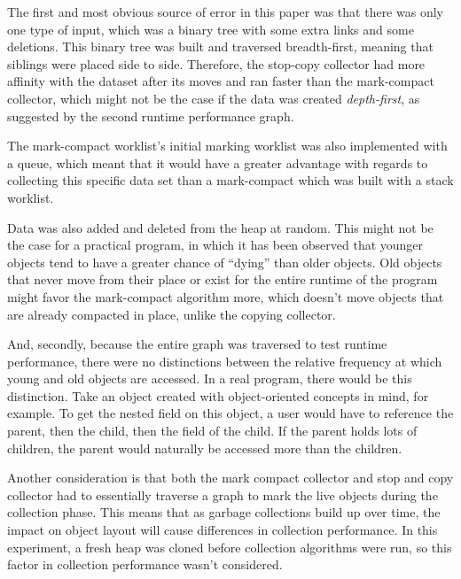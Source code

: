 \documentclass[index]{subfiles}
\begin{document}
The first and most obvious source of error in this paper was that there was only one type of input, which was a binary tree with some extra links and some deletions. This binary tree was built and traversed breadth-first, meaning that siblings were placed side to side. Therefore, the stop-copy collector had more affinity with the dataset after its moves and ran faster than the mark-compact collector, which might not be the case if the data was created \textit{depth-first}, as suggested by the second runtime performance graph.

The mark-compact worklist's initial marking worklist was also implemented with a queue, which meant that it would have a greater advantage with regards to collecting this specific data set than a mark-compact which was built with a stack worklist.

Data was also added and deleted from the heap at random. This might not be the case for a practical program, in which it has been observed that younger objects tend to have a greater chance of ``dying'' than older objects\cite{youtube_introductory_video}. Old objects that never move from their place or exist for the entire runtime of the program might favor the mark-compact algorithm more, which doesn't move objects that are already compacted in place, unlike the copying collector.

And, secondly, because the entire graph was traversed to test runtime performance, there were no distinctions between the relative frequency at which young and old objects are accessed. In a real program, there would be this distinction. Take an object created with object-oriented concepts in mind, for example. To get the nested field on this object, a user would have to reference the parent, then the child, then the field of the child. If the parent holds lots of children, the parent would naturally be accessed more than the children.


Another consideration is that both the mark compact collector and stop and copy collector had to essentially traverse a graph to mark the live objects during the collection phase. This means that as garbage collections build up over time, the impact on object layout will cause differences in collection performance. In this experiment, a fresh heap was cloned before collection algorithms were run, so this factor in collection performance wasn't considered.
\end{document}
